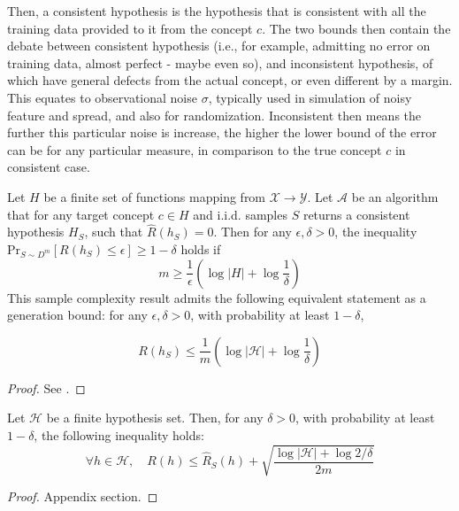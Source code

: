 \documentclass{article}
\begin{document}
Then, a consistent hypothesis is the hypothesis that is consistent with all the training data provided to it from the concept $c$. The two bounds then contain the debate between consistent hypothesis (i.e., for example, admitting no error on training data, almost perfect - maybe even so), and inconsistent hypothesis, of which have general defects from the actual concept, or even different by a margin. This equates to observational noise $\sigma$, typically used in simulation of noisy feature and spread, and also for randomization. Inconsistent then means the further this particular noise is increase, the higher the lower bound of the error can be for any particular measure, in comparison to the true concept $c$ in consistent case. 

\begin{theorem}
    Let $H$ be a finite set of functions mapping from $\mathcal{X}\to \mathcal{Y}$. Let $\mathcal{A}$ be an algorithm that for any target concept $c\in H$ and i.i.d. samples $S$ returns a consistent hypothesis $H_{S}$, such that $\hat{R}(h_{S}) = 0$. Then for any  $\epsilon,\delta>0$, the inequality $\mathrm{Pr}_{S\sim D^{m}}[R(h_{S})\leq \epsilon]\geq 1-\delta$ holds if $$m\geq \frac{1}{\epsilon}\left( \log{\lvert H \rvert }+\log{\frac{1}{\delta}} \right)$$
This sample complexity result admits the following equivalent statement as a generation bound: for any $\epsilon,\delta>0$, with probability at least $1-\delta$, 

\begin{equation}
    R(h_S) \leq \frac{1}{m} \left( \log{|\mathcal{H}|} + \log{\frac{1}{\delta}} \right)
\end{equation}
\end{theorem}
\begin{proof}
    See \cite{10.5555/2371238}.
\end{proof}

\begin{theorem}\label{thm:theorem_inconsistent}
    Let $\mathcal{H}$ be a finite hypothesis set. Then, for any $\delta > 0$, with probability at least $1-\delta$, the following inequality holds: 
    \begin{equation}
        \forall h \in \mathcal{H}, \quad R(h) \leq \hat{R}_S (h) + \sqrt{\frac{\log{|\mathcal{H}|}+ \log{2/\delta}}{2m}}
    \end{equation}
\end{theorem}
\begin{proof}
    Appendix section.
\end{proof}
\end{document}
